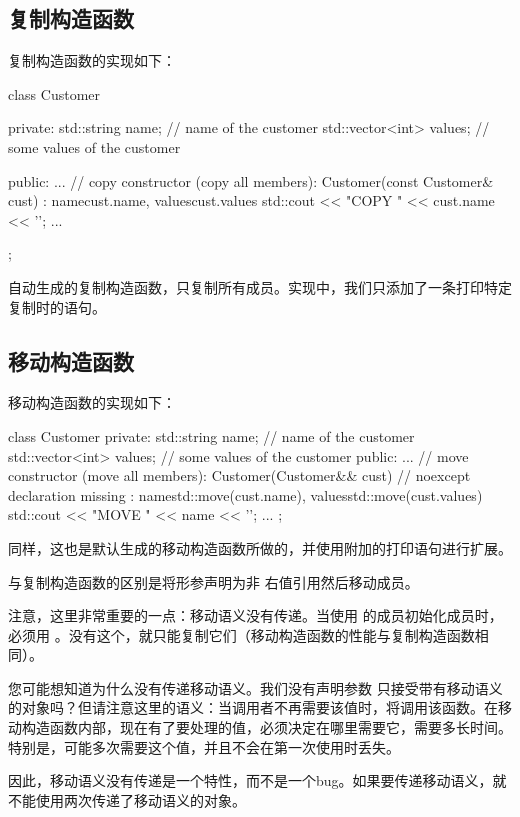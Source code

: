 \subsection{复制构造函数}

复制构造函数的实现如下：

\begin{cppcode}
class Customer {
private:
	std::string name; // name of the customer
	std::vector<int> values; // some values of the customer

public:
	...
	// copy constructor (copy all members):
	Customer(const Customer& cust)
	: name{cust.name}, values{cust.values} {
		std::cout << "COPY " << cust.name << '\n';
	}
	...
};
\end{cppcode}

自动生成的复制构造函数，只复制所有成员。实现中，我们只添加了一条打印特定  复制时的语句。

\subsection{移动构造函数}

移动构造函数的实现如下：

\begin{cppcode}
class Customer {
private:
	std::string name; // name of the customer
	std::vector<int> values; // some values of the customer
public:
	...
	// move constructor (move all members):
	Customer(Customer&& cust) // noexcept declaration missing
	: name{std::move(cust.name)}, values{std::move(cust.values)} {
		std::cout << "MOVE " << name << '\n';
	}
	...
};
\end{cppcode}

同样，这也是默认生成的移动构造函数所做的，并使用附加的打印语句进行扩展。

与复制构造函数的区别是将形参声明为非  右值引用然后移动成员。

注意，这里非常重要的一点：移动语义没有传递。当使用  的成员初始化成员时，必须用 。没有这个，就只能复制它们（移动构造函数的性能与复制构造函数相同）。

您可能想知道为什么没有传递移动语义。我们没有声明参数  只接受带有移动语义的对象吗？但请注意这里的语义：当调用者不再需要该值时，将调用该函数。在移动构造函数内部，现在有了要处理的值，必须决定在哪里需要它，需要多长时间。特别是，可能多次需要这个值，并且不会在第一次使用时丢失。

因此，移动语义没有传递是一个特性，而不是一个bug。如果要传递移动语义，就不能使用两次传递了移动语义的对象。

